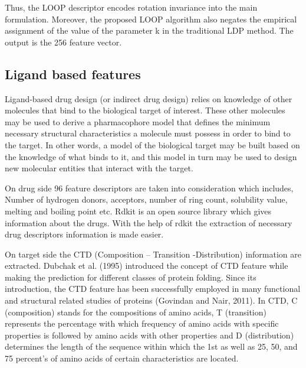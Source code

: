 \documentclass[conference]{IEEEtran}
\begin{document}
Thus, the LOOP descriptor encodes rotation invariance into the main formulation. Moreover, the proposed LOOP algorithm also negates the empirical assignment of the value of the parameter k in the traditional LDP method. The output is the 256 feature vector.

\subsection{Ligand based features}
Ligand-based drug design (or indirect drug design) relies on knowledge of other molecules that bind to the biological target of interest. These other molecules may be used to derive a pharmacophore model that defines the minimum necessary structural characteristics a molecule must possess in order to bind to the target. In other words, a model of the biological target may be built based on the knowledge of what binds to it, and this model in turn may be used to design new molecular entities that interact with the target.

On drug side 96 feature descriptors are taken into consideration which includes, Number of hydrogen donors, acceptors, number of ring count, solubility value, melting and boiling point etc. Rdkit is an open source library which gives information about the drugs. With the help of rdkit the extraction of necessary drug descriptors information is made easier.

On target side the CTD (Composition – Transition -Distribution) information are extracted. Dubchak et al. (1995) introduced the concept of CTD feature while making the prediction for different classes of protein folding. Since its introduction, the CTD feature has been successfully employed in many functional and structural related studies of proteins (Govindan and Nair, 2011). In CTD, C (composition) stands for the compositions of amino acids, T (transition) represents the percentage with which frequency of amino acids with specific properties is followed by amino acids with other properties and D (distribution) determines the length of the sequence within which the 1st as well as 25, 50, and 75 percent’s of amino acids of certain characteristics are located.
\end{document}
